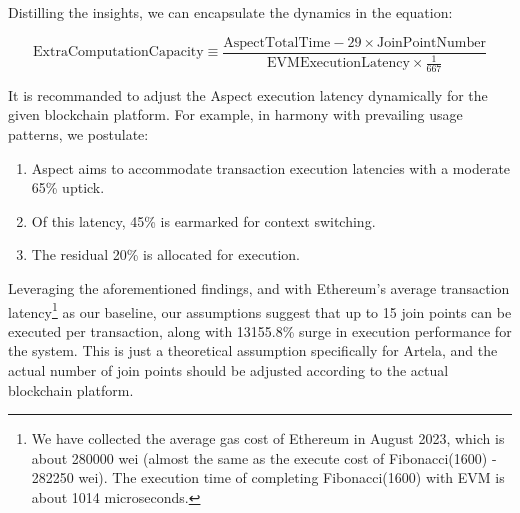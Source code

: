 Distilling the insights, we can encapsulate the dynamics in the equation:

\[
  \text{ExtraComputationCapacity} \equiv \frac{\text{AspectTotalTime} - 29 \times \text{JoinPointNumber}}{\text{EVMExecutionLatency} \times \frac{1}{667}}
\]

\pagebreak

It is recommanded to adjust the Aspect execution latency dynamically for the given blockchain platform. For example, in harmony with prevailing usage patterns, we postulate:

\begin{enumerate}
  \item Aspect aims to accommodate transaction execution latencies with a moderate 65\% uptick.
  \item Of this latency, 45\% is earmarked for context switching.
  \item The residual 20\% is allocated for execution.
\end{enumerate}

Leveraging the aforementioned findings, and with Ethereum's average transaction latency\footnote{We have collected the average gas cost of Ethereum in August 2023, which is about 280000 wei (almost the same as the execute cost of Fibonacci(1600) - 282250 wei). The execution time of completing Fibonacci(1600) with EVM is about 1014 microseconds.} as our baseline, our assumptions suggest that up to 15 join points can be executed per transaction, along with 13155.8\% surge in execution performance for the system. This is just a theoretical assumption specifically for Artela, and the actual number of join points should be adjusted according to the actual blockchain platform.
